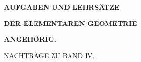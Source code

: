 \clearpage{}
\thispagestyle{empty}
\vspace*{4cm}
\begin{center}
\textbf{\Large AUFGABEN UND LEHRSÄTZE}\par\medskip
\textbf{DER ELEMENTAREN GEOMETRIE}\par\medskip
\textbf{ANGEHÖRIG.}\par\bigskip
NACHTRÄGE ZU BAND IV.
\end{center}
\clearpage
